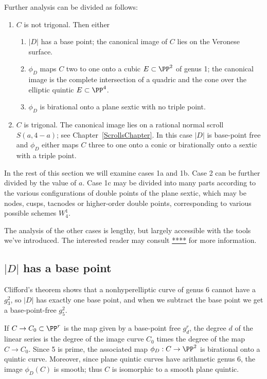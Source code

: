 Further analysis can be divided as follows:
\begin{enumerate}
\item $C$ is not trigonal. Then either
\begin{enumerate}
 \item $|D|$ has a base point; the canonical image of $C$ lies on the Veronese surface.
\item $\phi_{D}$ maps $C$ two to one onto a cubic $E \subset \PP^2$ of genus 1; the canonical image is the complete intersection of a quadric and the cone over the elliptic quintic $E\subset \PP^{4}$.
\item $\phi_{D}$ is birational onto a plane sextic with no triple point.
 \end{enumerate}
 \item $C$ is trigonal. The canonical image lies on a 
rational normal scroll $S(a,4-a)$; see Chapter~\ref{ScrollsChapter}.
In this case $|D|$ is base-point free and $\phi_{D}$  either maps $C$ three to one onto a conic
 or birationally onto a sextic with a triple point. 
\end{enumerate}

In the rest of this section we will examine cases 1a and 1b. Case 2 can be further divided by the value of $a$.
Case 1c may be divided into many parts according to the various configurations
of double points of the plane sextic, which may be nodes, cusps, tacnodes or higher-order double points,  corresponding to various possible schemes $W^{1}_{4}$. 

The analysis of the other cases is lengthy, but largely accessible with the tools we've introduced.
The interested reader may consult \url{****} for more information.

\subsection{$|D|$ has a base point}\label{g26 has a base point}
Clifford's theorem shows that a nonhyperelliptic curve of genus 6 cannot have a $g^2_3$, so   
$|D|$ has exactly one base point, and when we subtract the base point we get a base-point-free $g^2_5$. 

If $C \to C_0 \subset \PP^r$ is the map given by a base-point free $g^r_d$, the degree $d$ of the linear series is the degree of the image curve $C_0$ times the degree of the map $C \to C_0$. Since 5 is prime, the associated map $\phi_D : C \to \PP^2$ is birational onto a quintic curve. Moreover, since plane quintic curves have arithmetic genus 6, the image $\phi_D(C)$ is smooth; thus $C$ is isomorphic to a smooth plane quintic.

